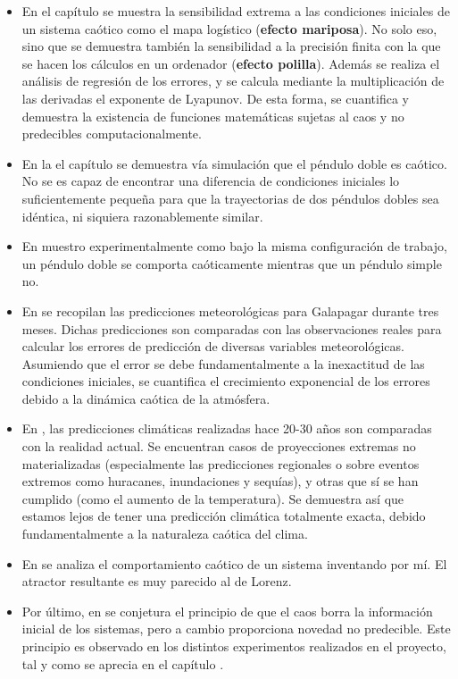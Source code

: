 \documentclass[
  10pt,
  a4paper,
  DIV=11,
  numbers=noendperiod,
  open=any]{scrreprt}
\numberwithin{equation}{chapter}
\numberwithin{equation}{section}
\renewcommand{\[}{\begin{equation}}
\renewcommand{\]}{\end{equation}}
\begin{document}
\begin{itemize}
\item
  En el capítulo  se muestra la sensibilidad extrema a las condiciones
  iniciales de un sistema caótico como el mapa logístico (\textbf{efecto
  mariposa}). No solo eso, sino que se demuestra también la sensibilidad
  a la precisión finita con la que se hacen los cálculos en un ordenador
  (\textbf{efecto polilla}). Además se realiza el análisis de regresión
  de los errores, y se calcula mediante la multiplicación de las
  derivadas el exponente de Lyapunov. De esta forma, se cuantifica y
  demuestra la existencia de funciones matemáticas sujetas al caos y no
  predecibles computacionalmente.
\item
  En la el capítulo  se demuestra vía simulación que el péndulo doble es caótico.
  No se es capaz de encontrar una diferencia de condiciones iniciales lo
  suficientemente pequeña para que la trayectorias de dos péndulos
  dobles sea idéntica, ni siquiera razonablemente similar. 
\item
  En 
  muestro experimentalmente como bajo la misma configuración de trabajo, un péndulo doble
  se comporta caóticamente mientras que un péndulo simple no.
\item
  En  se recopilan las predicciones
  meteorológicas para Galapagar durante tres meses. Dichas predicciones
  son comparadas con las observaciones reales para calcular los errores
  de predicción de diversas variables meteorológicas. Asumiendo que el
  error se debe fundamentalmente a la inexactitud de las condiciones
  iniciales, se cuantifica el crecimiento exponencial de los errores
  debido a la dinámica caótica de la atmósfera.
\item
  En
  , las predicciones climáticas
  realizadas hace 20-30 años son comparadas con la realidad actual. Se
  encuentran casos de proyecciones extremas no materializadas
  (especialmente las predicciones regionales o sobre eventos extremos
  como huracanes, inundaciones y sequías), y otras que sí se han
  cumplido (como el aumento de la temperatura). Se demuestra así que
  estamos lejos de tener una predicción climática totalmente exacta, debido
  fundamentalmente a la naturaleza caótica del clima.
\item
  En
   se analiza el comportamiento caótico de un
  sistema inventando por mí. El atractor resultante es muy parecido al
  de Lorenz.
\item
  Por último, en  se conjetura el principio de que el caos borra la
  información inicial de los sistemas, pero a cambio proporciona novedad
  no predecible. Este principio es observado en los distintos
  experimentos realizados en el proyecto, tal y como se aprecia en el capítulo . 
\end{itemize}
\end{document}
